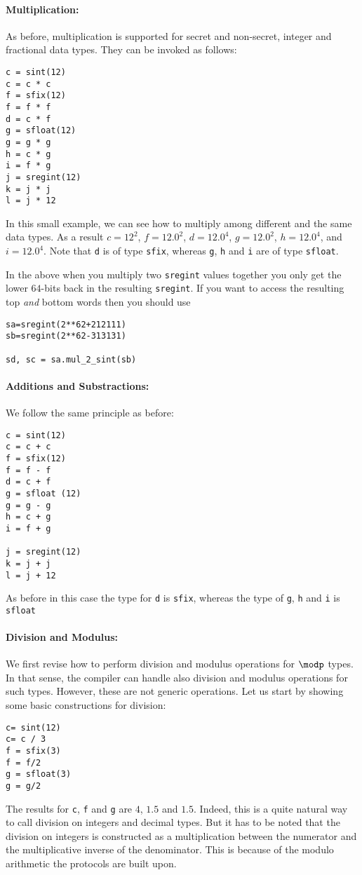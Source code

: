 \paragraph{Multiplication:}
As before, multiplication is supported for secret and non-secret, 
integer and fractional data types. They can be invoked as follows: 
\begin{lstlisting}
c = sint(12)
c = c * c
f = sfix(12)
f = f * f
d = c * f
g = sfloat(12)
g = g * g
h = c * g
i = f * g 
j = sregint(12)
k = j * j
l = j * 12
\end{lstlisting}
In this small example, we can see how to multiply among different and the same data types. 
As a result $c=12^2$, $f=12.0^{2}$, $d=12.0^{4}$, $g = 12.0^{2}$, 
$h= 12.0^{4}$, and $i=12.0^{4} $. Note that \verb|d| is of type \verb|sfix|, 
whereas \verb|g|, \verb|h| and \verb|i| are of type \verb|sfloat|. 

In the above when you  multiply two \verb|sregint| values together you only
get the lower $64$-bits back in the resulting \verb|sregint|.
If you want to access the resulting top {\em and} bottom words then you
should use
\begin{lstlisting}
sa=sregint(2**62+212111)
sb=sregint(2**62-313131)

sd, sc = sa.mul_2_sint(sb)
\end{lstlisting}


\paragraph{Additions and Substractions:}
We follow the same principle as before:
\begin{lstlisting}
c = sint(12)
c = c + c
f = sfix(12)
f = f - f
d = c + f
g = sfloat (12)
g = g - g 
h = c + g
i = f + g

j = sregint(12)
k = j + j
l = j + 12
\end{lstlisting}
As before in this case the type for \verb|d| is \verb|sfix|, 
whereas the type of \verb|g|, \verb|h| and \verb|i| is \verb|sfloat|

\paragraph{Division and Modulus:}
We first revise how to perform division and modulus operations for $\modp$ types. In that sense, the compiler can handle also division and modulus operations for such types. 
However, these are not generic operations. 
Let us start by showing some basic constructions for division: 
\begin{lstlisting}
c= sint(12)
c= c / 3
f = sfix(3)
f = f/2	
g = sfloat(3)
g = g/2	
\end{lstlisting}
The results for \verb|c|, \verb|f| and \verb|g| are $4$, $1.5$ and $1.5$. 
Indeed, this is a quite natural way to call division on integers and decimal types. 
But it has to be noted that the division on integers is constructed as a multiplication 
between the numerator and the multiplicative inverse of the denominator. 
This is because of the modulo arithmetic the protocols are built upon. 


